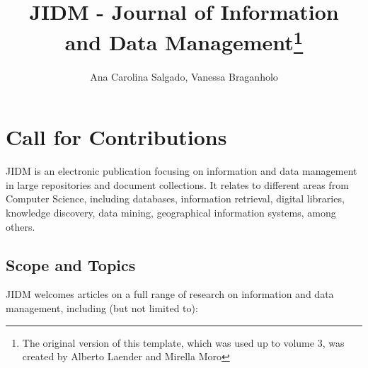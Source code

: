 \documentclass[jidm,a4paper]{jidm} %
\title{JIDM - Journal of Information \\ and Data Management\footnote{The original version of this template, which was used up to volume 3, was created by Alberto Laender and Mirella Moro}}
\author{Ana Carolina Salgado\inst{1}, Vanessa Braganholo\inst{2}}
\institute{Universidade Federal de Pernambuco, Brazil \\ \email{acs@cin.ufpe.br}
\and Universidade Federal Fluminense, Brazil \\ \email{vanessa@ic.uff.br}
}
\begin{document}
\begin{bottomstuff}
\end{bottomstuff}

\maketitle


\section{Call for Contributions}

JIDM is an electronic publication focusing on information and data management in large repositories and document collections. It relates to different areas from Computer Science, including databases, information retrieval, digital libraries, knowledge discovery, data mining, geographical information systems, among others.

\subsection{Scope and Topics}

JIDM welcomes articles on a full range of research on information and data management, including (but not limited to):
\end{document}
